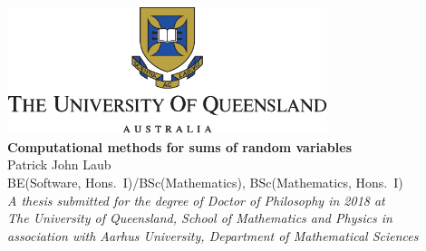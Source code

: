 \begin{titlepage}
\begin{center}
\includegraphics[width=0.70\textwidth]{logo} \\[2cm]

{ \large \bfseries Computational methods for sums of random variables }\\
Patrick John Laub \\
BE(Software, Hons.\ I)/BSc(Mathematics), BSc(Mathematics, Hons.\ I) \\[7cm]
{\em A thesis submitted for the degree of Doctor of Philosophy in 2018 at\\
The University of Queensland, School of Mathematics and Physics in \\
association with
Aarhus University, Department of Mathematical Sciences} \\

\end{center}
\end{titlepage}


